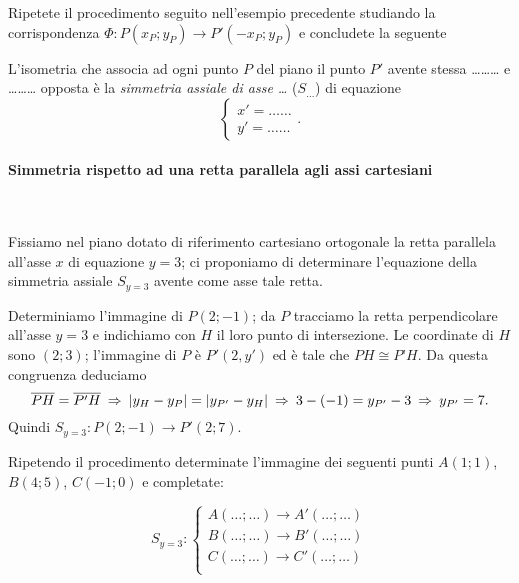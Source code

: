 Ripetete il procedimento seguito nell'esempio precedente studiando la corrispondenza $\Phi:P(x_P;y_P) \rightarrow P'(-x_P;y_P)$ e concludete la seguente
\begin{definizione}
L'isometria che associa ad ogni punto $P$ del piano il punto $P'$ avente stessa \ldots\ldots\ldots{} e \ldots\ldots\ldots{} opposta è la \emph{simmetria assiale di asse \ldots{}} ($S_{\ldots{}}$) di equazione
\[\begin{cases}x'=\ldots\ldots{}\\ y'=\ldots\ldots{}\end{cases}.\]
\end{definizione}

\paragraph{Simmetria rispetto ad una retta parallela agli assi cartesiani}
~

\begin{exrig}
\begin{esempio}
Fissiamo nel piano dotato di riferimento cartesiano ortogonale la retta parallela all'asse $x$ di equazione $y=3$; ci proponiamo di determinare l'equazione della simmetria assiale $S_{y=3}$ avente come asse tale retta.\vspace{7pt}

Determiniamo l'immagine di $P(2;-1)$; da $P$ tracciamo la retta perpendicolare all'asse $y=3$ e indichiamo con $H$ il loro punto di intersezione. Le coordinate di $H$ sono $(2;3)$; l'immagine di $P$ è $P'(2,y')$ ed è tale che $PH\cong P’H$. Da questa congruenza deduciamo
\[\overline{PH}=\overline{P'H}\:\Rightarrow\:\left|y_H-y_P\right| = \left| y_{P'}-y_H\right| \:\Rightarrow\: 3-(-1)=y_{P'}-3 \:\Rightarrow\: y_{P'}=7.\]
Quindi $S_{y=3}:P(2;-1)\rightarrow P'(2;7)$.

Ripetendo il procedimento determinate l'immagine dei seguenti punti $A(1;1)$, $B(4;5)$, $C(-1;0)$ e completate:

\[S_{y=3}:\begin{cases}A(\ldots{};\ldots{}) \rightarrow A'(\ldots{};\ldots{})\\
B(\ldots{};\ldots{}) \rightarrow B'(\ldots{};\ldots{})\\
C(\ldots{};\ldots{}) \rightarrow C'(\ldots{};\ldots{})\\
 \end{cases}\]
\end{esempio}
\end{exrig}

